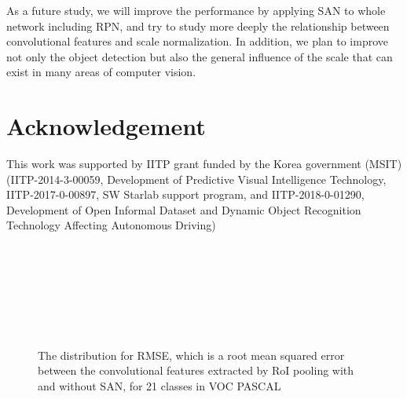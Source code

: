 \documentclass[runningheads]{llncs}
\begin{document}
As a future study, we will improve the performance by applying SAN to whole network including RPN, and try to study more deeply the relationship between convolutional features and scale normalization.
In addition, we plan to improve not only the object detection but also the general influence of the scale that can exist in many areas of computer vision.


\section*{Acknowledgement}
This work was supported by IITP grant funded by the Korea government (MSIT)
(IITP-2014-3-00059, Development of Predictive Visual Intelligence Technology, 
IITP-2017-0-00897, SW Starlab support program,
and 
IITP-2018-0-01290, Development of Open Informal Dataset and Dynamic Object Recognition Technology Affecting Autonomous Driving)





\begin{figure}[pt]
	
	\\
	\\
	\\
	\\
	\\
	\\
	\caption{The distribution for RMSE, which is a root mean squared error between the convolutional features extracted by RoI pooling with and without SAN, for 21 classes in VOC PASCAL}
	\centering
	\label{fig:sandist}
\end{figure}
\end{document}

